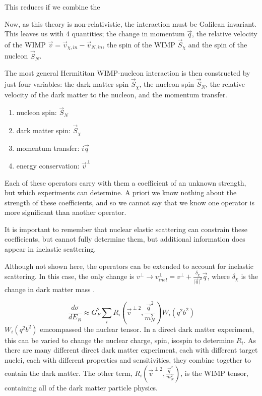 \par
This reduces if we combine the 

\par
Now, as this theory is non-relativistic, the interaction must be Galilean invariant.
This leaves us with 4 quantities; the change in momentum $\vec{q}$, the relative velocity of the WIMP $\vec{v}=\vec{v}_{\chi,in} - \vec{v}_{N,in}$, the spin of the WIMP $\vec{S}_{\chi}$ and the spin of the nucleon $\vec{S}_{N}$.


\par
The most general Hermititan WIMP-nucleon interaction is then constructed by just four variables: the dark matter spin $\Vec{S}_{\chi}$, the nucleon spin $\Vec{S}_{N}$, the relative velocity of the dark matter to the nucleon, and the momentum transfer.
\begin{enumerate}
    \item nucleon spin: $\Vec{S}_{N}$
    \item dark matter spin: $\Vec{S}_{\chi}$
    \item momentum transfer: $i\Vec{q}$
    \item energy conservation: $\Vec{v}^{\bot}$
\end{enumerate}
\par
Each of these operators carry with them a coefficient of an unknown strength, but which experiments can determine.
A priori we know nothing about the strength of these coefficients, and so we cannot say that we know one operator is more significant than another operator.

\par
It is important to remember that nuclear elastic scattering can constrain these coefficients, but cannot fully determine them, but additional information does appear in inelastic scattering.





\par
Although not shown here, the operators can be extended to account for inelastic scattering.
In this case, the only change is $v^{\perp} \rightarrow v_{inel}^{\perp}=v^{\perp} + \frac{\delta_\chi}{\vert\vec{q}\vert^2}\vec{q}$, where $\delta_\chi$ is the change in dark matter mass \cite{inelastics_eft_ref}.


\begin{equation}
    \frac{d\sigma}{dE_R} \approx G_F^2 \sum_{i} R_i (\vec{v}^{\perp 2}, \frac{\vec{q}^2}{m_N^2}) W_i(q^2b^2)
\end{equation}
$W_i(q^2b^2)$ emcompassed the nuclear tensor.
In a direct dark matter experiment, this can be varied to change the nuclear charge, spin, isospin to determine $R_i$.
As there are many different direct dark matter experiment, each with different target nuclei, each with different properties and sensitivities, they combine together to contain the dark matter.
The other term, $R_i (\vec{v}^{\perp 2}, \frac{\vec{q}^2}{m_N^2})$, is the WIMP tensor, containing all of the dark matter particle physics.



